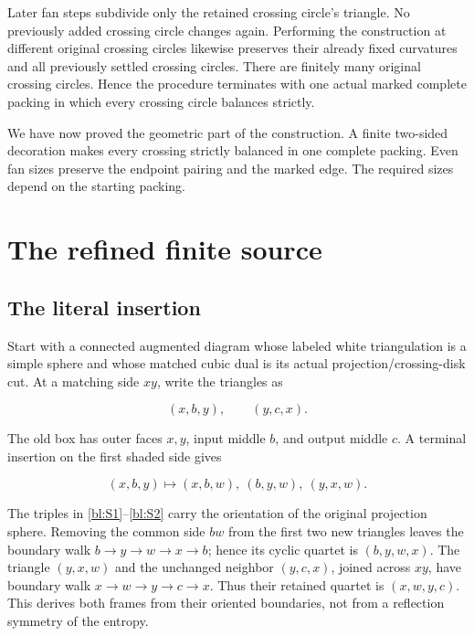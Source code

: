 Later fan steps subdivide only the retained crossing circle's triangle. No
previously added crossing circle changes again. Performing the construction at
different original crossing circles likewise preserves their already fixed
curvatures and all previously settled crossing circles. There are finitely many
original crossing circles. Hence the procedure terminates with one actual marked
complete packing in which every crossing circle balances strictly.

We have now proved the geometric part of the construction. A finite
two-sided decoration makes every crossing strictly balanced in one
complete packing. Even fan sizes preserve the endpoint pairing and the
marked edge. The required sizes depend on the starting packing.

\section{The refined finite source}\label{bl:the-full-finite-source-at-both-level-parities}

\subsection{The literal insertion}\label{bl:the-literal-insertion}

Start with a connected augmented diagram whose labeled white triangulation is a simple sphere and whose matched cubic dual is its actual projection/crossing-disk cut. At a matching side \(xy\), write the triangles as

\begin{equation}\label{bl:S1}
(x,b,y),\qquad (y,c,x).
\end{equation}

The old box has outer faces \(x,y\), input middle \(b\), and output middle \(c\). A terminal insertion on the first shaded side gives

\begin{equation}\label{bl:S2}
(x,b,y)\longmapsto (x,b,w),\ (b,y,w),\ (y,x,w).
\end{equation}

The triples in \eqref{bl:S1}--\eqref{bl:S2} carry the orientation of the original projection sphere. Removing the common side \(bw\) from the first two new triangles leaves the boundary walk \(b\to y\to w\to x\to b\); hence its cyclic quartet is \((b,y,w,x)\). The triangle \((y,x,w)\) and the unchanged neighbor \((y,c,x)\), joined across \(xy\), have boundary walk \(x\to w\to y\to c\to x\). Thus their retained quartet is \((x,w,y,c)\). This derives both frames from their oriented boundaries, not from a reflection symmetry of the entropy.


